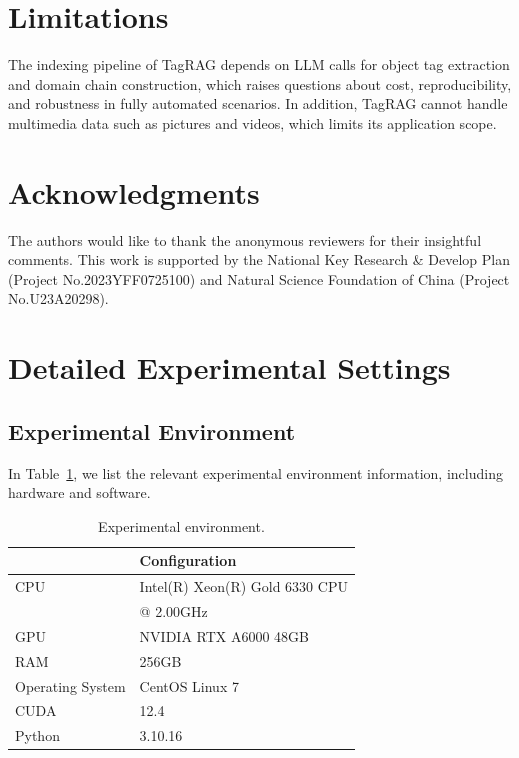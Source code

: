 \documentclass[11pt]{article}
\begin{document}


\section*{Limitations}
The indexing pipeline of TagRAG depends on LLM calls for object tag extraction and domain chain construction, which raises questions about cost, reproducibility, and robustness in fully automated scenarios.
In addition, TagRAG cannot handle multimedia data such as pictures and videos, which limits its application scope.



\section*{Acknowledgments}
The authors would like to thank the anonymous reviewers for their insightful comments. This work is supported by the National Key Research \& Develop Plan (Project No.2023YFF0725100) and Natural Science Foundation of China (Project No.U23A20298).



% 







\clearpage

\appendix

\section{Detailed Experimental Settings}
\label{app:experimental details}


\subsection{Experimental Environment}
\label{app:environment}
In Table~\ref{tab:experimental environment}, we list the relevant experimental environment information, including hardware and software.

\begin{table}[h]
\centering
\small
\begin{tabular}{ll}
\toprule
& Configuration \\ \midrule
CPU & Intel(R) Xeon(R) Gold 6330 CPU \\ & @ 2.00GHz \\
GPU & NVIDIA RTX A6000 48GB \\
RAM & 256GB \\
Operating System & CentOS Linux 7 \\
CUDA & 12.4 \\
Python & 3.10.16 \\
\bottomrule
\end{tabular}
\caption{Experimental environment.}
\label{tab:experimental environment}
\end{table}
\end{document}
